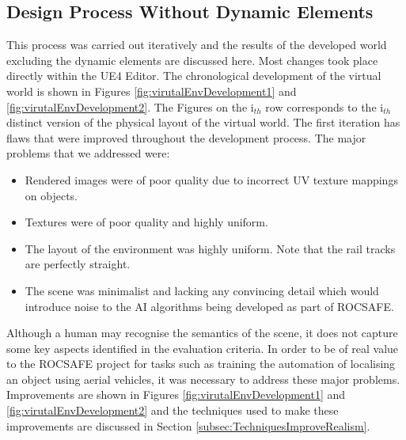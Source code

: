 \subsection{Design Process Without Dynamic Elements}
This process was carried out iteratively and the results of the developed world excluding the dynamic elements are discussed here. Most changes took place directly within the UE4 Editor. The chronological development of the virtual world is shown in Figures \ref{fig:virutalEnvDevelopment1} and \ref{fig:virutalEnvDevelopment2}. The Figures on the i$_{th}$ row corresponds to the i$_{th}$ distinct version of the physical layout of the virtual world. The first iteration has flaws that were improved throughout the development process. The major problems that we addressed were:
\begin{itemize}
    \item Rendered images were of poor quality due to incorrect UV texture mappings %
    on objects.
    \item Textures were of poor quality and highly uniform.
    \item The layout of the environment was highly uniform. Note that the rail tracks are perfectly straight.
    \item The scene was minimalist and lacking any convincing detail which would introduce noise to the AI algorithms being developed as part of ROCSAFE.
\end{itemize}
Although a human may recognise the semantics of the scene, it does not capture some key aspects identified in the evaluation criteria. In order to be of real value to the ROCSAFE project for tasks such as training the automation of localising an object using aerial vehicles, it was necessary to address these major problems. Improvements are shown in Figures \ref{fig:virutalEnvDevelopment1} and \ref{fig:virutalEnvDevelopment2} and the techniques used to make these improvements are discussed in Section \ref{subsec:TechniquesImproveRealism}.


